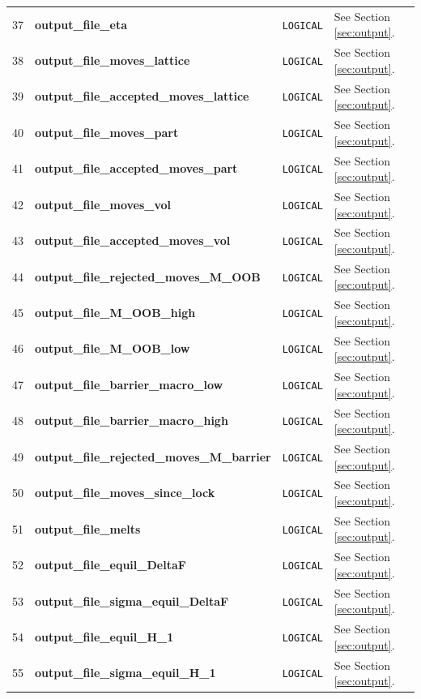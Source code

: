 \documentclass{report}
\begin{document}
\begin{landscape}
\begin{center}
\begin{longtable}{l l l p{8cm}}
37 & \textbf{output\_file\_eta}  &  \texttt{LOGICAL}  & See Section \ref{sec:output}. \\
38 & \textbf{output\_file\_moves\_lattice}  &  \texttt{LOGICAL}  & See Section \ref{sec:output}. \\
39 & \textbf{output\_file\_accepted\_moves\_lattice}  &  \texttt{LOGICAL}  & See Section \ref{sec:output}. \\
40 & \textbf{output\_file\_moves\_part}  &  \texttt{LOGICAL}  & See Section \ref{sec:output}. \\
41 & \textbf{output\_file\_accepted\_moves\_part}  &  \texttt{LOGICAL}  & See Section \ref{sec:output}. \\
42 & \textbf{output\_file\_moves\_vol}  &  \texttt{LOGICAL}  & See Section \ref{sec:output}. \\
43 & \textbf{output\_file\_accepted\_moves\_vol}  &  \texttt{LOGICAL}  & See Section \ref{sec:output}. \\
44 & \textbf{output\_file\_rejected\_moves\_M\_OOB}  &  \texttt{LOGICAL}  & See Section \ref{sec:output}. \\
45 & \textbf{output\_file\_M\_OOB\_high}  &  \texttt{LOGICAL}  & See Section \ref{sec:output}. \\
46 & \textbf{output\_file\_M\_OOB\_low}  &  \texttt{LOGICAL}  & See Section \ref{sec:output}. \\
47 & \textbf{output\_file\_barrier\_macro\_low}  &  \texttt{LOGICAL}  & See Section \ref{sec:output}. \\
48 & \textbf{output\_file\_barrier\_macro\_high}  &  \texttt{LOGICAL}  & See Section \ref{sec:output}. \\
49 & \textbf{output\_file\_rejected\_moves\_M\_barrier}  &  \texttt{LOGICAL}  & See Section \ref{sec:output}. \\
50 & \textbf{output\_file\_moves\_since\_lock}  &  \texttt{LOGICAL}  & See Section \ref{sec:output}. \\
51 & \textbf{output\_file\_melts}  &  \texttt{LOGICAL}  & See Section \ref{sec:output}. \\
52 & \textbf{output\_file\_equil\_DeltaF}  &  \texttt{LOGICAL}  & See Section \ref{sec:output}. \\
53 & \textbf{output\_file\_sigma\_equil\_DeltaF}  &  \texttt{LOGICAL}  & See Section \ref{sec:output}. \\
54 & \textbf{output\_file\_equil\_H\_1}  &  \texttt{LOGICAL}  & See Section \ref{sec:output}. \\
55 & \textbf{output\_file\_sigma\_equil\_H\_1}  &  \texttt{LOGICAL}  & See Section \ref{sec:output}. \\

\end{longtable}
\end{center}
\end{landscape}
\end{document}
